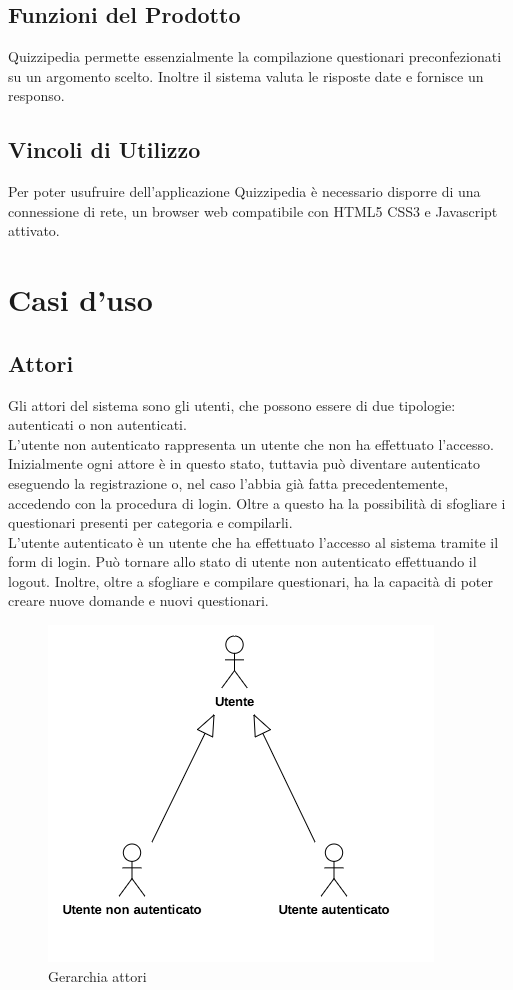 \documentclass[a4paper,11pt]{article}
\begin{document}
	\subsection{Funzioni del Prodotto}
		Quizzipedia permette essenzialmente la compilazione questionari preconfezionati su un argomento scelto. Inoltre il sistema valuta le risposte date e fornisce un responso.
	\subsection{Vincoli di Utilizzo}
		Per poter usufruire dell'applicazione Quizzipedia è necessario disporre di una connessione di
rete, un browser web compatibile con HTML5 CSS3 e Javascript attivato.
	
	\newpage
	\section{Casi d'uso}
\subsection{Attori}
Gli attori del sistema sono gli utenti, che possono essere di due tipologie: autenticati o non autenticati.\\ 
L'utente non autenticato rappresenta un utente che non ha effettuato l'accesso. Inizialmente ogni attore è in questo stato, tuttavia può diventare autenticato eseguendo la registrazione o, nel caso l'abbia già fatta precedentemente, accedendo con la procedura di login. Oltre a questo ha la possibilità di  sfogliare i questionari presenti per categoria e compilarli.\\
L'utente autenticato è un utente che ha effettuato l'accesso al sistema tramite il form di login. Può tornare allo stato di utente non autenticato effettuando il logout. Inoltre, oltre a sfogliare e compilare questionari, ha la capacità di poter creare nuove domande e nuovi questionari.\\

\begin{figure}[h!]
\centering
\includegraphics[scale=1]{../immagini/Actors.png}
\caption{Gerarchia attori}
\end{figure}
\end{document}
